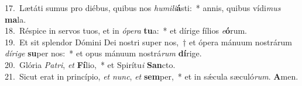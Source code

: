{17.~}Lætáti sumus pro diébus, quibus nos \textit{hu}\textit{mi}\textit{li}\textbf{á}sti:~* annis, quibus vídi\textit{mus} \textbf{ma}la.\\
{18.~}Réspice in servos tuos, et in \textit{ó}\textit{pe}\textit{ra} \textbf{tu}a:~* et dírige fílios \textit{e}\textbf{ó}rum.\\
{19.~}Et sit splendor Dómini Dei nostri super nos,~† et ópera mánuum nostrárum \textit{dí}\textit{ri}\textit{ge} \textbf{su}per nos:~* et opus mánuum nostrá\textit{rum} \textbf{dí}rige.\\
{20.~}Glória \textit{Pa}\textit{tri}, \textit{et} \textbf{Fí}lio,~* et Spirítu\textit{i} \textbf{San}cto.\\
{21.~}Sicut erat in princípio, \textit{et} \textit{nunc}, \textit{et} \textbf{sem}per,~* et in sǽcula sæculó\textit{rum}. \textbf{A}men.\\
